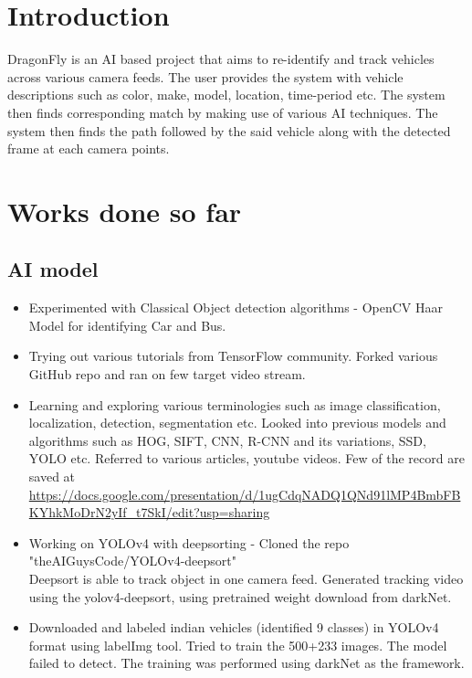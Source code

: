 \documentclass{reportFormat}
\begin{document}
	\section*{Introduction}
	DragonFly is an AI based project that aims to re-identify and track vehicles across various camera feeds. The user provides the system with vehicle descriptions such as color, make, model, location, time-period etc. The system then finds corresponding match by making use of various AI techniques. The system then finds the path followed by the said vehicle along with the detected frame at each camera points.
	
	\section*{Works done so far}
	
	\subsection*{AI model}
	\begin{itemize}
		\item Experimented with Classical Object detection algorithms - OpenCV Haar Model for identifying Car and Bus.
		\item Trying out various tutorials from TensorFlow community. Forked various GitHub repo and ran on few target video stream.
		
		\item Learning and exploring various terminologies such as image classification, localization, detection, segmentation etc. Looked into previous models and algorithms such as HOG, SIFT, CNN, R-CNN and its variations, SSD, YOLO etc. Referred to various articles, youtube videos. Few of the record are saved at \url{https://docs.google.com/presentation/d/1ugCdqNADQ1QNd91lMP4BmbFBKYhkMoDrN2yIf_t7SkI/edit?usp=sharing}
		
		\item Working on YOLOv4 with deepsorting - Cloned the repo "theAIGuysCode/YOLOv4-deepsort" \\
		Deepsort is able to track object in one camera feed. Generated tracking video using the yolov4-deepsort, using pretrained weight download from darkNet.
		
		\item Downloaded and labeled indian vehicles (identified 9 classes) in YOLOv4 format using labelImg tool. Tried to train the 500+233 images. The model failed to detect. The training was performed using darkNet as the framework.

		
	\end{itemize}
\end{document}
